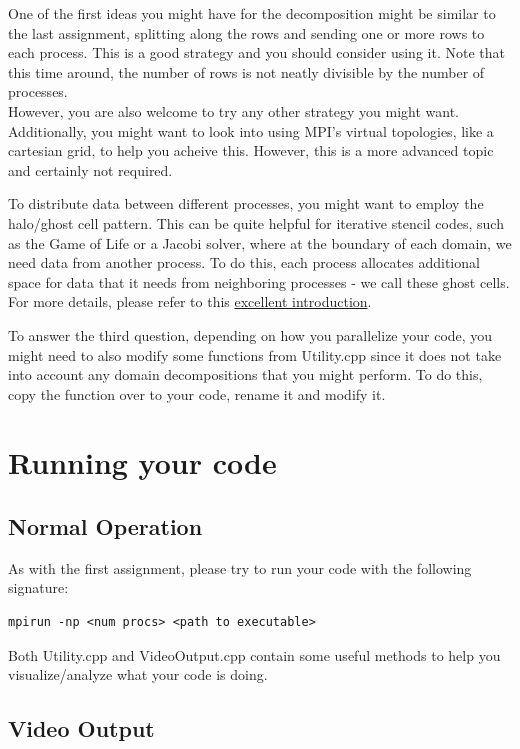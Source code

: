 \documentclass[11pt]{article}
\begin{document}
One of the first ideas you might have for the decomposition might be similar to the last assignment, splitting along the rows and sending one or more rows to each process. This is a good strategy and you should consider using it. Note that this time around, the number of rows is not neatly divisible by the number of processes.\\
However, you are also welcome to try any other strategy you might want. Additionally, you might want to look into 
using MPI's virtual topologies, like a cartesian grid, to help you acheive this. However, this is a more advanced topic and certainly not required. 

To distribute data between different processes, you might want to employ the halo/ghost cell pattern. This can be quite
helpful for iterative stencil codes, such as the Game of Life or a Jacobi solver, where at the boundary of each
domain, we need data from another process. To do this, each process allocates additional space for data that it needs
from neighboring processes - we call these ghost cells. For more details, please refer to this \href{http://fredrikbk.com/publications/ghost\_cell\_pattern.pdf}{excellent introduction}.

To answer the third question, depending on how you parallelize your code, you might need to also modify some functions from Utility.cpp since it does not take into account any domain decompositions that you might perform. To do this, copy the function over to your code, rename it and modify it.


\section{Running your code}
\label{sec:org7d813a7}

\subsection{Normal Operation}
\label{sec:org6bdd59d}
As with the first assignment, please try to run your code with the following signature:

\begin{verbatim}
mpirun -np <num procs> <path to executable>
\end{verbatim}

Both Utility.cpp and VideoOutput.cpp contain some useful methods to help you visualize/analyze what your code is doing.

\subsection{Video Output}
\label{sec:orga32caab}
\end{document}

